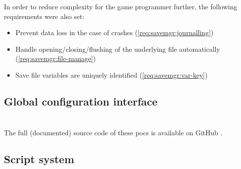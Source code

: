 \documentclass{projdoc}
\begin{document}
In order to reduce complexity for the game programmer further, the following
requirements were also set:\noparbreak

\begin{itemize}
	\item Prevent data loss in the case of crashes (\cref{req:savemgr:journalling})
	\item Handle opening/closing/flushing of the underlying file automatically
		(\cref{req:savemgr:file-manage})
	\item Save file variables are uniquely identified (\cref{req:savemgr:var-key})
\end{itemize}

% 
% 

\subsection{Global configuration interface}



\appendix

\section{}

The full (documented) source code of these \glspl{poc} is available on GitHub
\autocite{crepe:code-repo}.

\subsection{Script system}
\label{poc:scripts}
\end{document}
